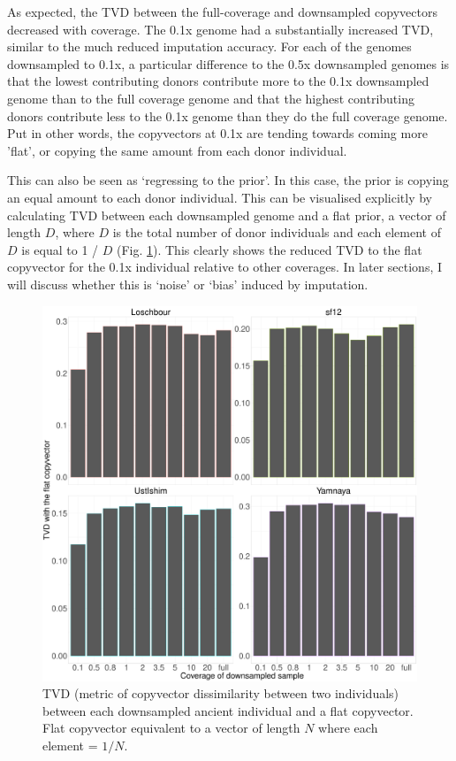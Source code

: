 As expected, the TVD between the full-coverage and downsampled copyvectors decreased with coverage. The 0.1x genome had a substantially increased TVD, similar to the much reduced imputation accuracy. For each of the genomes downsampled to 0.1x, a particular difference to the 0.5x downsampled genomes is that the lowest contributing donors contribute more to the 0.1x downsampled genome than to the full coverage genome and that the highest contributing donors contribute less to the 0.1x genome than they do the full coverage genome. Put in other words, the copyvectors at 0.1x are tending towards coming more 'flat', or copying the same amount from each donor individual. 

This can also be seen as `regressing to the prior'. In this case, the prior is copying an equal amount to each donor individual. This can be visualised explicitly by calculating TVD between each downsampled genome and a flat prior, a vector of length $D$, where $D$ is the total number of donor individuals and each element of $D$ is equal to 1 / $D$ (Fig. \ref{fig:TVD_ancients_flat_prior}). This clearly shows the reduced TVD to the flat copyvector for the 0.1x individual relative to other coverages. In later sections, I will discuss whether this is `noise' or `bias' induced by imputation. 

\begin{figure}[htp]
    \centering
    \includegraphics[width=1.0\textwidth]{../images/chapter1/TVD_ancients_flat_prior.pdf}
    \caption{TVD (metric of copyvector dissimilarity between two individuals) between each downsampled ancient individual and a flat copyvector. Flat copyvector equivalent to a vector of length $N$ where each element = $1/N$.}
    \label{fig:TVD_ancients_flat_prior}
\end{figure}

